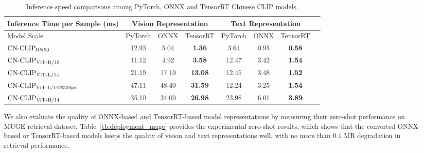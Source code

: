 \documentclass[11pt]{article}
\begin{document}
\begin{table*}[t]
\center
\small
\begin{adjustbox}{max width=1.\textwidth}
\begin{tabular}{@{\extracolsep{\fill}}lccccccc}
\toprule
  Inference Time per Sample (ms)
  &\multicolumn{3}{c}{Vision Representation}
  &\multicolumn{3}{c}{Text Representation}
  \\
\midrule
  Model Scale & PyTorch & ONNX & TensorRT & PyTorch & ONNX & TensorRT
  \\
\midrule
  $\text{CN-CLIP}\rm_{RN50}$
  & 12.93	& 5.04	& \textbf{1.36} & 	3.64 & 	0.95 &	\textbf{0.58}
  \\
  $\text{CN-CLIP}\rm_{ViT\text{-}B/16}$
  & 11.12	& 4.92	& \textbf{3.58}	& 12.47	& 3.42	& \textbf{1.54}
  \\
  $\text{CN-CLIP}\rm_{ViT\text{-}L/14}$
  & 21.19	& 17.10	& \textbf{13.08}	& 12.45	& 3.48	& \textbf{1.52}
  \\
  $\text{CN-CLIP}\rm_{ViT\text{-}L/14@336px}$
  & 47.11	& 48.40	& \textbf{31.59}	& 12.24	& 3.25	& \textbf{1.54}
  \\
  $\text{CN-CLIP}\rm_{ViT\text{-}H/14}$
  & 35.10	& 34.00	& \textbf{26.98}	& 23.98	& 6.01	& \textbf{3.89}
  \\  

\bottomrule
\end{tabular}
\end{adjustbox}
\caption{Inference speed comparisons among PyTorch, ONNX and TensorRT Chinese CLIP models.}
\label{tb:deployment_speed}
\end{table*} 
We also evaluate the quality of ONNX-based and TensorRT-based model representations by measuring their zero-shot performance on MUGE retrieval dataset. Table~\ref{tb:deployment_muge} provides the experimental zero-shot results, which shows that the converted ONNX-based or TensorRT-based models keeps the quality of vision and text representations well, with no more than $0.1$ MR degradation in retrieval performance.
\end{document}
